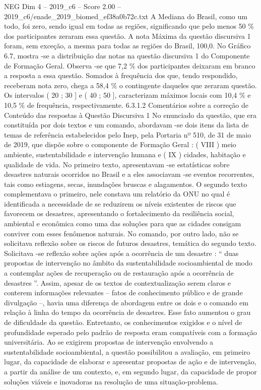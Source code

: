 \begin{textsample}{NEG Dim 4 – 2019\_c6 – Score 2.00 – 2019\_c6/enade\_2019\_biomed\_ef38a0b72c.txt}
A Mediana do Brasil, como um todo, foi zero, sendo igual em todas as regiões, significando que pelo menos 50 \% dos participantes zeraram essa questão.
A nota Máxima da questão discursiva 1 foram, sem exceção, a mesma para todas as regiões do Brasil, 100,0.
No Gráfico 6.7, mostra -se a distribuição das notas na questão discursiva 1 do Componente de Formação Geral.
Observa -se que 7,2 \% dos participantes deixaram em branco a resposta a essa questão.
Somados à frequência dos que, tendo respondido, receberam nota zero, chega a 58,4 \% o contingente daqueles que zeraram questão.
Os intervalos ( 20 ; 30 ] e ( 40 ; 50 ], caracterizam máximos locais com 10,4 \% e 10,5 \% de frequência, respectivamente. 6.3.1.2 Comentários sobre a correção de Conteúdo das respostas à Questão Discursiva 1 No enunciado da questão, que era constituída por dois textos e um comando, abordavam -se dois itens da lista de temas de referência estabelecidos pelo Inep, pela Portaria nº 510, de 31 de maio de 2019, que dispõe sobre o componente de Formação Geral : ( VIII ) meio ambiente, sustentabilidade e intervenção humana e ( IX ) cidades, habitação e qualidade de vida.
No primeiro texto, apresentavam -se estatísticas sobre desastres naturais ocorridos no Brasil e a eles associavam -se eventos recorrentes, tais como estiagens, secas, inundações bruscas e alagamentos.
O segundo texto complementava o primeiro, nele constava um relatório da ONU no qual é identificada a necessidade de se reduzirem os níveis existentes de riscos que favorecem os desastres, apresentando o fortalecimento da resiliência social, ambiental e econômica como uma das soluções para que as cidades consigam conviver com esses fenômenos naturais.
No comando, por outro lado, não se solicitava reflexão sobre os riscos de futuros desastres, temática do segundo texto.
Solicitava -se reflexão sobre ações após a ocorrência de um desastre : “ duas propostas de intervenção no âmbito da sustentabilidade socioambiental de modo a contemplar ações de recuperação ou de restauração após a ocorrência de desastres ”.
Assim, apesar de os textos de contextualização serem claros e conterem informações relevantes – fatos de conhecimento público e de grande divulgação –, havia uma diferença de abordagem entre os dois e o comando em relação à linha do tempo da ocorrência de desastres.
Esse fato aumentou o grau de dificuldade da questão.
Entretanto, os conhecimentos exigidos e o nível de profundidade esperado pelo padrão de resposta eram compatíveis com a formação universitária.
Ao se exigirem propostas de intervenção envolvendo a sustentabilidade socioambiental, a questão possibilitou a avaliação, em primeiro lugar, da capacidade de elaborar e apresentar propostas de ação e de intervenção, a partir da análise de um contexto, e, em segundo lugar, da capacidade de propor soluções viáveis e inovadoras na resolução de uma situação-problema.

\end{textsample}
